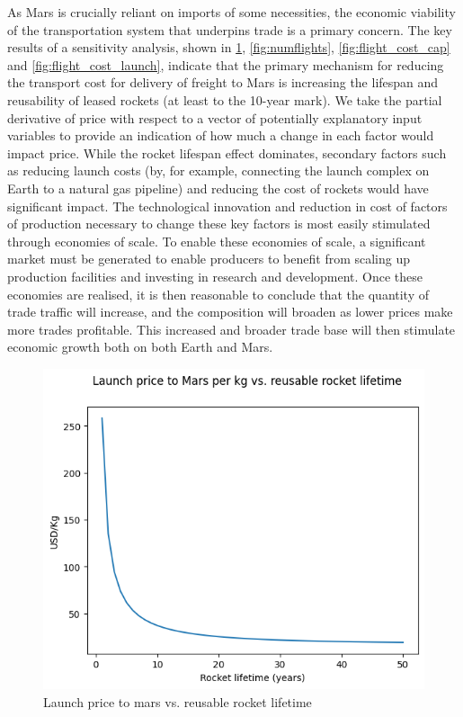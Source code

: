 \documentclass[fleqn,10pt]{Stylesheet} %
\begin{document}
As Mars is crucially reliant on imports of some necessities, the economic viability of the transportation system that underpins trade is a primary concern. The key results of a sensitivity analysis, shown in \ref{fig:reuse}, \ref{fig:numflights}, \ref{fig:flight_cost_cap} and \ref{fig:flight_cost_launch}, indicate that the primary mechanism for reducing the transport cost for delivery of freight to Mars is increasing the lifespan and reusability of leased rockets (at least to the 10-year mark). We take the partial derivative of price with respect to a vector of potentially explanatory input variables to provide an indication of how much a change in each factor would impact price. While the rocket lifespan effect dominates, secondary factors such as reducing launch costs (by, for example, connecting the launch complex on Earth to a natural gas pipeline) and reducing the cost of rockets would have significant impact. The technological innovation and reduction in cost of factors of production necessary to change these key factors is most easily stimulated through economies of scale. To enable these economies of scale, a significant market must be generated to enable producers to benefit from scaling up production facilities and investing in research and development. Once these economies are realised, it is then reasonable to conclude that the quantity of trade traffic will increase, and the composition will broaden as lower prices make more trades profitable. This increased and broader trade base will then stimulate economic growth both on both Earth and Mars.

\begin{figure}
    \centering
    \includegraphics[width=\linewidth]{fig_reuse.png}
    \caption{Launch price to mars vs. reusable rocket lifetime}
    \label{fig:reuse}
\end{figure}
\end{document}
